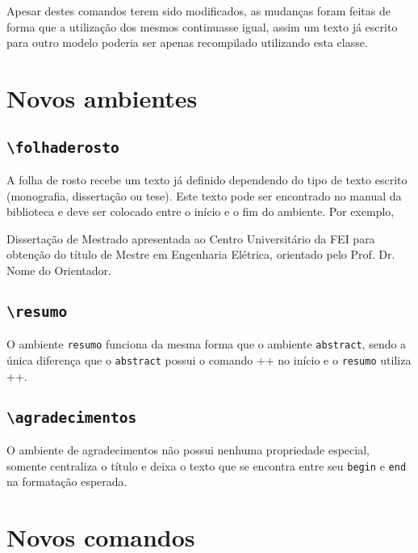 \documentclass{fei}
\begin{document}
    Apesar destes comandos terem sido modificados, as mudanças foram feitas de forma que a utilização dos mesmos continuasse igual, assim um texto já escrito para outro modelo poderia ser apenas recompilado utilizando esta classe.

\section{Novos ambientes}

    \subsection{\texttt{\textbackslash folhaderosto}}
    A folha de rosto recebe um texto já definido dependendo do tipo de texto escrito (monografia, dissertação ou tese). Este texto pode ser encontrado no manual da biblioteca e deve ser colocado entre o início e o fim do ambiente. Por exemplo,
    \begin{latexcode}
\begin{folhaderosto}
Dissertação de Mestrado apresentada ao Centro Universitário
da FEI para obtenção do título de Mestre em Engenharia
Elétrica, orientado pelo Prof. Dr. Nome do Orientador. 
\end{folhaderosto}
    \end{latexcode}

    \subsection{\texttt{\textbackslash resumo}}
    O ambiente \texttt{resumo} funciona da mesma forma que o ambiente \texttt{abstract}, sendo a única diferença que o \texttt{abstract} possui o comando \latexinline++ no início e o \texttt{resumo} utiliza \latexinline++.

    \subsection{\texttt{\textbackslash agradecimentos}}
    O ambiente de agradecimentos não possui nenhuma propriedade especial, somente centraliza o título e deixa o texto que se encontra entre seu \texttt{begin} e \texttt{end} na formatação esperada.

\section{Novos comandos}
    
\end{document}
